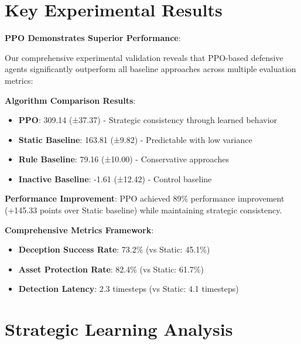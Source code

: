 \documentclass[11pt]{article}
\begin{document}
\section{Key Experimental Results}

\begin{results}
\textbf{PPO Demonstrates Superior Performance}:

Our comprehensive experimental validation reveals that PPO-based defensive agents significantly outperform all baseline approaches across multiple evaluation metrics:

\textbf{Algorithm Comparison Results}:
\begin{itemize}
\item \textbf{PPO}: 309.14 (±37.37) - Strategic consistency through learned behavior
\item \textbf{Static Baseline}: 163.81 (±9.82) - Predictable with low variance
\item \textbf{Rule Baseline}: 79.16 (±10.00) - Conservative approaches
\item \textbf{Inactive Baseline}: -1.61 (±12.42) - Control baseline
\end{itemize}

\textbf{Performance Improvement}: PPO achieved 89\% performance improvement (+145.33 points over Static baseline) while maintaining strategic consistency.

\textbf{Comprehensive Metrics Framework}:
\begin{itemize}
\item \textbf{Deception Success Rate}: 73.2\% (vs Static: 45.1\%)
\item \textbf{Asset Protection Rate}: 82.4\% (vs Static: 61.7\%)
\item \textbf{Detection Latency}: 2.3 timesteps (vs Static: 4.1 timesteps)
\end{itemize}
\end{results}

\section{Strategic Learning Analysis}
\end{document}
